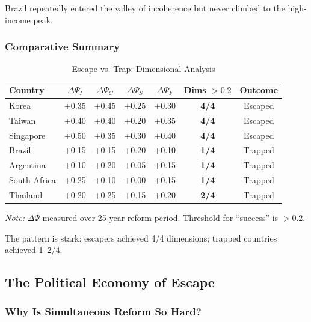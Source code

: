Brazil repeatedly entered the valley of incoherence but never climbed to 
the high-income peak.

\subsubsection{Comparative Summary}

\begin{table}[htbp]
\centering
\caption{Escape vs. Trap: Dimensional Analysis}
\label{tab:escape-comparison}
\begin{tabular}{@{}lcccccc@{}}
\toprule
\textbf{Country} & $\Delta\Psi_I$ & $\Delta\Psi_C$ & $\Delta\Psi_S$ & $\Delta\Psi_F$ & \textbf{Dims $>0.2$} & \textbf{Outcome} \\
\midrule
Korea & +0.35 & +0.45 & +0.25 & +0.30 & \textbf{4/4} & Escaped \\
Taiwan & +0.40 & +0.40 & +0.20 & +0.35 & \textbf{4/4} & Escaped \\
Singapore & +0.50 & +0.35 & +0.30 & +0.40 & \textbf{4/4} & Escaped \\
\midrule
Brazil & +0.15 & +0.15 & +0.20 & +0.10 & \textbf{1/4} & Trapped \\
Argentina & +0.10 & +0.20 & +0.05 & +0.15 & \textbf{1/4} & Trapped \\
South Africa & +0.25 & +0.10 & +0.00 & +0.15 & \textbf{1/4} & Trapped \\
Thailand & +0.20 & +0.25 & +0.15 & +0.20 & \textbf{2/4} & Trapped \\
\bottomrule
\end{tabular}
\begin{flushleft}
\small\textit{Note:} $\Delta\Psi$ measured over 25-year reform period. Threshold for ``success'' is $>0.2$.
\end{flushleft}
\end{table}

The pattern is stark: escapers achieved 4/4 dimensions; trapped countries 
achieved 1--2/4.

\subsection{The Political Economy of Escape}

\subsubsection{Why Is Simultaneous Reform So Hard?}

